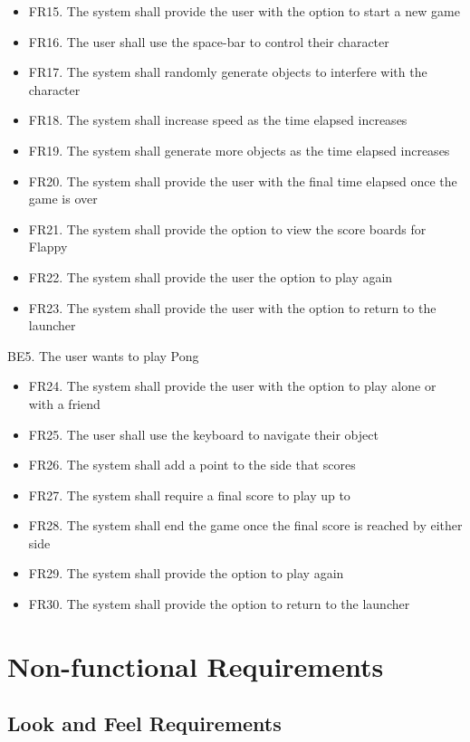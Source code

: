 \documentclass[12pt, titlepage]{article}
\begin{document}
    \begin{itemize}
        \item FR15. The system shall provide the user with the option to start a new game
        \item FR16. The user shall use the space-bar to control their character
        \item FR17. The system shall randomly generate objects to interfere with the character
        \item FR18. The system shall increase speed as the time elapsed increases
        \item FR19. The system shall generate more objects as the time elapsed increases
        \item FR20. The system shall provide the user with the final time elapsed once the game is over
        \item FR21. The system shall provide the option to view the score boards for Flappy
        \item FR22. The system shall provide the user the option to play again
        \item FR23. The system shall provide the user with the option to return to the launcher
    \end{itemize}
    BE5. The user wants to play Pong
    \begin{itemize}
        \item FR24. The system shall provide the user with the option to play alone or with a friend
        \item FR25. The user shall use the keyboard to navigate their object
        \item FR26. The system shall add a point to the side that scores
        \item FR27. The system shall require a final score to play up to
        \item FR28. The system shall end the game once the final score is reached by either side
        \item FR29. The system shall provide the option to play again 
        \item FR30. The system shall provide the option to return to the launcher
    \end{itemize}


\section{Non-functional Requirements}

\subsection{Look and Feel Requirements}
\end{document}

